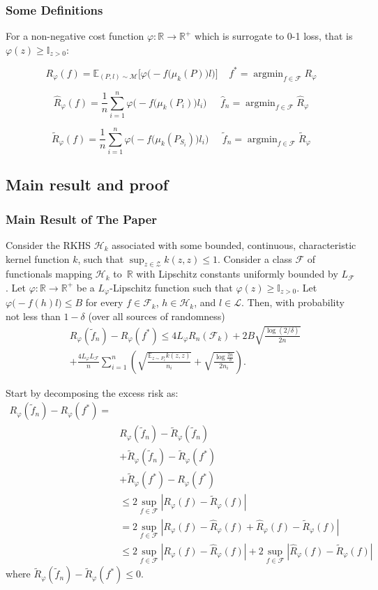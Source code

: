 \documentclass{beamer}
\DeclareMathOperator*{\argmin}{argmin}
\renewcommand{\H}{\mathcal{H}}
\renewcommand{\L}{\mathcal{L}}
\newcommand{\F}{\mathcal{F}}
\newcommand{\Z}{\mathcal{Z}}
\newcommand{\R}{\mathbb{R}}
\newcommand{\I}{\mathbb{I}}
\newcommand{\Rp}{R_{\varphi}}
\newcommand{\Rpn}{\hat{R}_{\varphi}}
\newcommand{\Rpnt}{\tilde{R}_{\varphi}}
\newcommand{\f}{f^*}
\newcommand{\fn}{\hat{f}_n}
\newcommand{\fnt}{\tilde{f}_n}
\begin{document}
\begin{frame}
\frametitle{Some Definitions}
For a non-negative cost function $\varphi : \mathbb{R} \to \mathbb{R}^+$ which is surrogate to 0-1 loss, that is $\varphi(z) \geq \I_{z>0}$:
\begin{definition}
$$\Rp(f) = \mathbb{E}_{(P, l)\sim \mathcal{M}}\Big[\varphi\Big(-f\big(\mu_k(P)\big)l\Big)\Big] 
\;\;\;\; \f = \argmin_{f\in\F} \Rp$$
\end{definition}
\pause
\begin{definition}
$$
\Rpn(f) = \frac{1}{n} \sum_{i = 1}^{n} \varphi\Big(-f\big(\mu_k(P_i)\big)l_i\Big)
\;\;\;\;\; \fn = \argmin_{f\in\F} \Rpn
$$
\end{definition}
\pause
\begin{definition}
$$
\Rpnt(f) = \frac{1}{n} \sum_{i = 1}^{n} \varphi\Big(-f\big(\mu_k(P_{S_i})\big)l_i\Big)
\;\;\;\;\; \fnt = \argmin_{f\in\F} \Rpnt
$$
\end{definition}
\end{frame}
\subsection{Main result and proof}
\begin{frame}
\frametitle{Main Result of The Paper}
\begin{theorem}
	\label{thm:risk-bound}
	Consider the RKHS $\H_k$ associated with some bounded, continuous,
	characteristic kernel function $k$, such that $\sup_{z \in \Z} k(z,z)\leq 1$.
	Consider a class $\F$ of functionals mapping $\H_k$ to~$\R$ with Lipschitz
	constants uniformly bounded by $L_{\F}$.  Let $\varphi\colon \R\to\R^+$ be a
	$L_{\varphi}$-Lipschitz function such that $\varphi(z) \geq \I_{z>0}$.
	Let $\varphi\bigl(-f(h) l\bigr) \leq B$ for every $f\in\F_k$, $h \in \H_k$, and
	$l\in\L$.  Then, with probability not less than $1-\delta$ (over all sources of
	randomness) 
	\begin{align*}
	&\Rp(\fnt) - \Rp(\f)
	\leq
	4 L_\varphi R_n(\F_k) + 2B\sqrt{\frac{\log(2/\delta)}{2n}}\\
	&+
	\frac{4L_\varphi L_{\F}}{n}
	\sum_{i=1}^n
	\left(
	\sqrt{\frac{\mathbb{E}_{z\sim P_i}{k(z,z)}}{n_i}} + \sqrt{\frac{\log\frac{2n}{\delta}}{2n_i}}
	\right).
	\end{align*}
\end{theorem}
\end{frame}
\begin{frame}
Start by decomposing the excess risk as:
\begin{align*}
\Rp(\fnt) - \Rp(\f) = \\
&\Rp(\fnt) - \Rpnt(\fnt)\\
&+
\Rpnt(\fnt) -\Rpnt(\f)\\
&+
\Rpnt(\f) - \Rp(\f)\\
&\leq
2\sup_{f\in \F}|\Rp(f) - \Rpnt(f)|\\
&=
2\sup_{f\in \F}|\Rp(f) - \Rpn(f) + \Rpn(f) - \Rpnt(f)|\\
&\leq
\label{eq:excess-bound1}
2\sup_{f\in \F}|\Rp(f) - \Rpn(f)|
+
2\sup_{f\in \F}|\Rpn(f) - \Rpnt(f)|
\end{align*}
where $\Rpnt(\fnt) -\Rpnt(\f) \leq 0$.
\end{frame}
\end{document}
